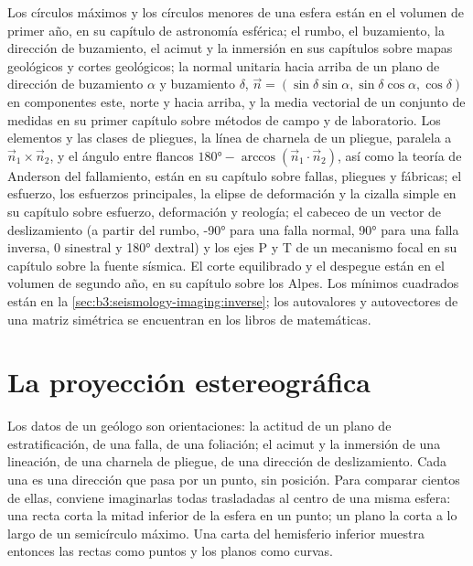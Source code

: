 \begin{recall}
Los círculos máximos y los círculos menores de una esfera están en el volumen de primer año, en su capítulo
de astronomía esférica; el rumbo, el buzamiento, la dirección de buzamiento, el acimut y la inmersión en sus
capítulos sobre mapas geológicos y cortes geológicos; la normal unitaria hacia arriba de un
plano de dirección de buzamiento $\alpha$ y buzamiento $\delta$, $\vec n = (\sin\delta
\sin\alpha, \sin\delta\cos\alpha, \cos\delta)$ en componentes este, norte y hacia arriba,
y la media vectorial de un conjunto de medidas en su primer capítulo sobre
métodos de campo y de laboratorio. Los elementos y las clases de pliegues, la línea de charnela de un
pliegue, paralela a $\vec n_1\times\vec n_2$, y el ángulo entre flancos
$\ang{180} - \arccos(\vec n_1\cdot\vec n_2)$, así como la teoría de Anderson del
fallamiento, están en su capítulo sobre fallas, pliegues y fábricas; el esfuerzo, los
esfuerzos principales, la elipse de deformación y la cizalla simple en su capítulo sobre
esfuerzo, deformación y reología; el cabeceo de un vector de deslizamiento (a partir del rumbo,
\ang{-90} para una falla normal, \ang{90} para una falla inversa, 0 sinestral y
\ang{180} dextral) y los ejes P y T de un mecanismo focal en su capítulo sobre
la fuente sísmica. El corte equilibrado y el despegue están en
el volumen de segundo año, en su capítulo sobre los Alpes. Los mínimos cuadrados están en
la \cref{sec:b3:seismology-imaging:inverse}; los autovalores y autovectores de una
matriz simétrica se encuentran en los libros de matemáticas.
\end{recall}

\section{La proyección estereográfica}\label{sec:b3:structural-analysis:stereo}

Los datos de un geólogo son orientaciones: la actitud de un plano de estratificación, de una
falla, de una foliación; el acimut y la inmersión de una lineación, de una charnela de pliegue, de una
dirección de deslizamiento. Cada una es una dirección que pasa por un punto, sin posición. Para
comparar cientos de ellas, conviene imaginarlas todas trasladadas al centro de una misma esfera:
una recta corta la mitad inferior de la esfera en un punto; un plano la corta a lo largo de
un semicírculo máximo. Una carta del hemisferio inferior muestra entonces las rectas como
puntos y los planos como curvas.

